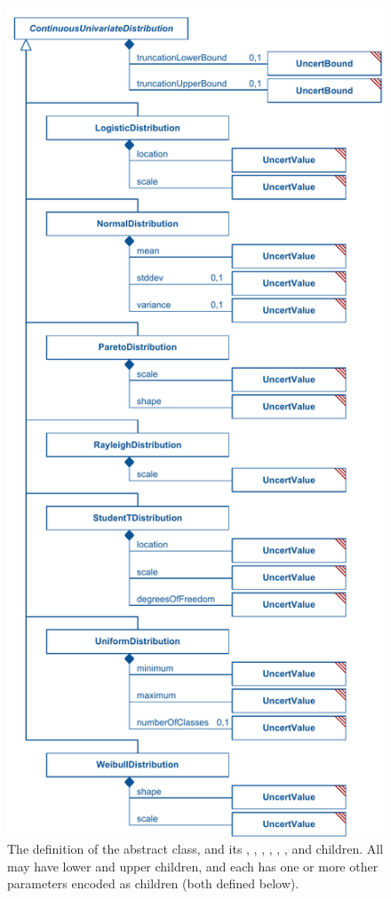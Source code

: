 \begin{figure}[htb]
\includegraphics[width=0.55\linewidth]{figs/continuousUnivariateDistribution_second.pdf}
\caption{The definition of the \ContinuousUnivariateDistribution abstract class, and its \LogisticDistribution, \NormalDistribution, \ParetoDistribution, \RayleighDistribution, \StudentTDistribution, \UniformDistribution, and \WeibullDistribution children.  All may have lower and upper \UncertBound children, and each has one or more other parameters encoded as \UncertValue children (both defined below).}
\label{fig:continuousUnivariateDistribution_second}
\end{figure}

